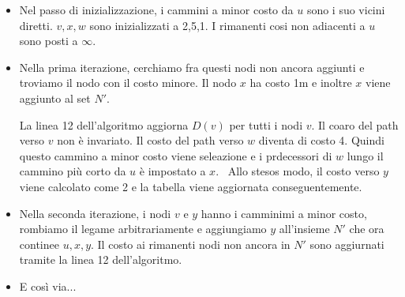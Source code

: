 \documentclass{book}
\newcommand{\textdots}{...}
\begin{document}
{}
\begin{itemize}
  \item Nel passo di inizializzazione, i cammini a minor costo da $u$ sono i
  suo vicini diretti. $v, x, w$ sono inizializzati a 2,5,1. I rimanenti cosi
  non adiacenti a $u$ sono posti a $\infty .$
  
  \item Nella prima iterazione, cerchiamo fra questi nodi non ancora aggiunti
  e troviamo il nodo con il costo minore. Il nodo $x$ ha costo 1m e inoltre
  $x$ viene aggiunto al set $N'$.
  
  La linea 12 dell'algoritmo aggiorna $D (v)$ per tutti i nodi $v$. Il coaro
  del path verso $v$ non {\`e} invariato. Il costo del path verso $w$ diventa
  di costo 4. Quindi questo cammino a minor costo viene seleazione e i
  prdecessori di $w$ lungo il cammino pi{\`u} corto da $u$ {\`e} impostato a
  $x$. \ Allo stesos modo, il costo verso $y$ viene calcolato come 2 e la
  tabella viene aggiornata conseguentemente.
  
  \item Nella seconda iterazione, i nodi $v$ e $y$ hanno i camminimi a minor
  costo, rombiamo il legame arbitrariamente e aggiungiamo $y$ all'insieme $N'$
  che ora continee $u, x, y$. Il costo ai rimanenti nodi non ancora in $N'$
  sono aggiurnati tramite la linea 12 dell'algoritmo.
  
  \item E cos{\`i} via{\textdots}
\end{itemize}
\end{document}
